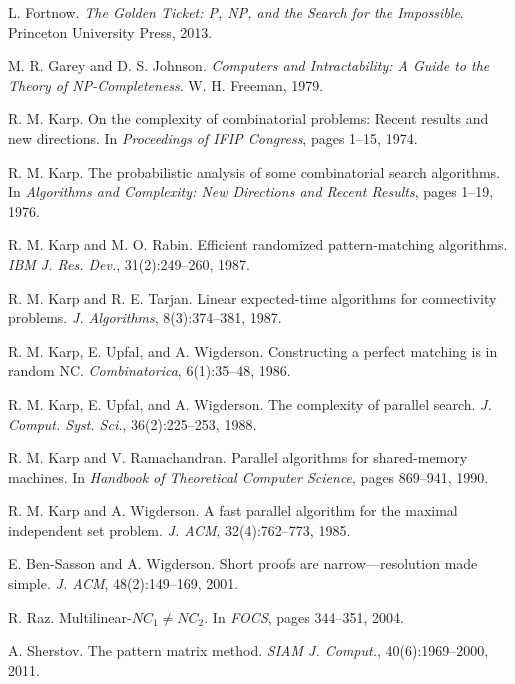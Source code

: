 \documentclass[11pt]{article}
\theoremstyle{definition}
\begin{document}
\begin{thebibliography}{99}
 L. Fortnow. \emph{The Golden Ticket: P, NP, and the Search for the Impossible}. Princeton University Press, 2013.

 M. R. Garey and D. S. Johnson. \emph{Computers and Intractability: A Guide to the Theory of NP-Completeness}. W. H. Freeman, 1979.

 R. M. Karp. On the complexity of combinatorial problems: Recent results and new directions. In \emph{Proceedings of IFIP Congress}, pages 1--15, 1974.

 R. M. Karp. The probabilistic analysis of some combinatorial search algorithms. In \emph{Algorithms and Complexity: New Directions and Recent Results}, pages 1--19, 1976.

 R. M. Karp and M. O. Rabin. Efficient randomized pattern-matching algorithms. \emph{IBM J. Res. Dev.}, 31(2):249--260, 1987.

 R. M. Karp and R. E. Tarjan. Linear expected-time algorithms for connectivity problems. \emph{J. Algorithms}, 8(3):374--381, 1987.

 R. M. Karp, E. Upfal, and A. Wigderson. Constructing a perfect matching is in random NC. \emph{Combinatorica}, 6(1):35--48, 1986.

 R. M. Karp, E. Upfal, and A. Wigderson. The complexity of parallel search. \emph{J. Comput. Syst. Sci.}, 36(2):225--253, 1988.

 R. M. Karp and V. Ramachandran. Parallel algorithms for shared-memory machines. In \emph{Handbook of Theoretical Computer Science}, pages 869--941, 1990.

 R. M. Karp and A. Wigderson. A fast parallel algorithm for the maximal independent set problem. \emph{J. ACM}, 32(4):762--773, 1985.

 E. Ben-Sasson and A. Wigderson. Short proofs are narrow—resolution made simple. \emph{J. ACM}, 48(2):149--169, 2001.

 R. Raz. Multilinear-$NC_1 \neq NC_2$. In \emph{FOCS}, pages 344--351, 2004.

 A. Sherstov. The pattern matrix method. \emph{SIAM J. Comput.}, 40(6):1969--2000, 2011.

\end{thebibliography}
\end{document}
